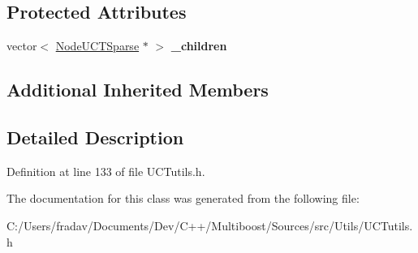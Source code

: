 \subsection*{Protected Attributes}
\begin{DoxyCompactItemize}
\item 
\hypertarget{classMultiBoost_1_1InnerNodeUCTSparse_abf7677cc37a994e73ff66bb4e7531ae4}{vector$<$ \hyperlink{classMultiBoost_1_1NodeUCTSparse}{Node\-U\-C\-T\-Sparse} $\ast$ $>$ {\bfseries \-\_\-children}}\label{classMultiBoost_1_1InnerNodeUCTSparse_abf7677cc37a994e73ff66bb4e7531ae4}

\end{DoxyCompactItemize}
\subsection*{Additional Inherited Members}


\subsection{Detailed Description}


Definition at line 133 of file U\-C\-Tutils.\-h.



The documentation for this class was generated from the following file\-:\begin{DoxyCompactItemize}
\item 
C\-:/\-Users/fradav/\-Documents/\-Dev/\-C++/\-Multiboost/\-Sources/src/\-Utils/U\-C\-Tutils.\-h\end{DoxyCompactItemize}
